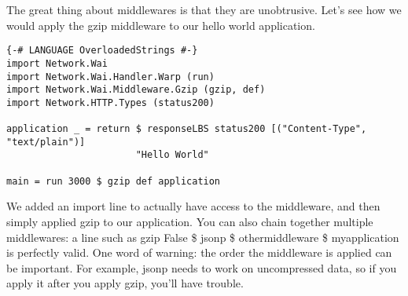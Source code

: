 The great thing about middlewares is that they are unobtrusive. Let's see how we would 
apply the gzip middleware to our hello world application.

\begin{lstlisting}
{-# LANGUAGE OverloadedStrings #-}
import Network.Wai
import Network.Wai.Handler.Warp (run)
import Network.Wai.Middleware.Gzip (gzip, def)
import Network.HTTP.Types (status200)

application _ = return $ responseLBS status200 [("Content-Type", "text/plain")]
                       "Hello World"

main = run 3000 $ gzip def application
\end{lstlisting}%

We added an import line to actually have access to the middleware, and then simply 
applied gzip to our application. You can also chain together multiple middlewares: 
a line such as gzip False \$ jsonp \$ othermiddleware \$ myapplication is perfectly valid. 
One word of warning: the order the middleware is applied can be important. For example, 
jsonp needs to work on uncompressed data, so if you apply it after you apply gzip, 
you'll have trouble.

